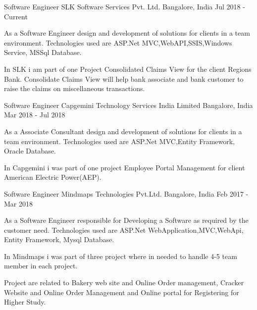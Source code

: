 

\begin{cventries}

  \cventry
    {Software Engineer} %
    {SLK Software Services Pvt. Ltd.} %
    {Bangalore, India} %
    {Jul 2018 - Current} %
    {
      \begin{cvitems} %
        \item {As a Software Engineer design and development of solutions for clients in a team environment. Technologies used are ASP.Net MVC,WebAPI,SSIS,Windows Service, MSSql Database.}
  \item {In SLK i am part of one Project Consolidated Claims View for the client Regions Bank. Consolidate Claims View will help bank associate and bank customer to raise the claims on miscellaneous transactions.}
      \end{cvitems}
    }

  \cventry
    {Software Engineer} %
    {Capgemini
Technology Services India Limited} %
    {Bangalore, India} %
    {Mar 2018 - Jul 2018} %
    {
      \begin{cvitems} %
        \item {As a Associate Consultant design and development of solutions for clients in a team environment. Technologies used are ASP.Net MVC,Entity Framework, Oracle Database.}
  \item {In Capgemini i was  part of one project Employee Portal Management for client American Electric Power(AEP).}
      \end{cvitems}
    }

  \cventry
    {Software Engineer} %
    {Mindmaps Technologies Pvt.Ltd.} %
    {Bangalore, India} %
    {Feb 2017 - Mar 2018} %
    {
      \begin{cvitems} %
        \item {As a Software Engineer responsible for Developing a Software as required by the customer need. Technologies used are ASP.Net WebApplication,MVC,WebApi, Entity Framework, Mysql Database.}
  \item {In Mindmaps i was part of three project where in needed to handle 4-5 team member in each project.}
  \item {Project are related to Bakery web site and Online Order management, Cracker Website and Online Order Management and Online portal for Registering for Higher Study.}
      \end{cvitems}
    }


\end{cventries}
